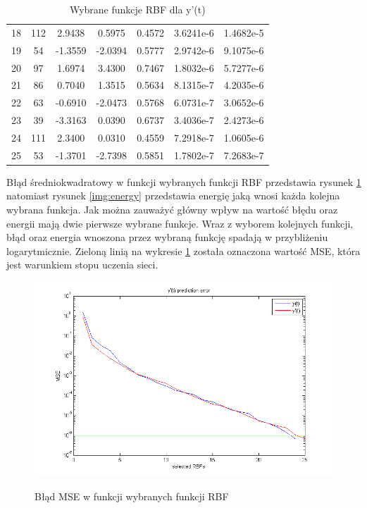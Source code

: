 \begin{table}[ht!]
\begin{tabular}{ |c| c| c| c| c| c| c| }
   18 & 112 &   2.9438 &   0.5975  &  0.4572 &   3.6241e-6 & 1.4682e-5 \\
   19 &  54 &  -1.3559 &  -2.0394  &  0.5777 &   2.9742e-6 & 9.1075e-6 \\
   20 &  97 &   1.6974 &   3.4300  &  0.7467 &   1.8032e-6 & 5.7277e-6 \\
   21 &  86 &   0.7040 &   1.3515  &  0.5634 &   8.1315e-7 & 4.2035e-6 \\
   22 &  63 &  -0.6910 &  -2.0473  &  0.5768 &   6.0731e-7 & 3.0652e-6 \\
   23 &  39 &  -3.3163 &   0.0390  &  0.6737 &   3.4036e-7 & 2.4273e-6 \\
   24 & 111 &   2.3400 &   0.0310  &  0.4559 &   7.2918e-7 & 1.0605e-6 \\
   25 &  53 &  -1.3701 &  -2.7398  &  0.5851 &   1.7802e-7 & 7.2683e-7 \\
    \hline
\end{tabular}

\caption{Wybrane funkcje RBF dla y'(t)}
\label{tab:rbf_tabela_x2}
\end{table}

\clearpage

Błąd średniokwadratowy w funkcji wybranych funkcji RBF przedstawia rysunek \ref{img:prediction_error} natomiast rysunek \ref{img:energy} przedstawia energię jaką wnosi każda kolejna wybrana funkcja. Jak można zauważyć główny wpływ na wartość błędu oraz energii mają dwie pierwsze wybrane funkcje. Wraz z wyborem kolejnych funkcji, błąd oraz energia wnoszona przez wybraną funkcję spadają w przybliżeniu logarytmicznie. Zieloną linią na wykresie \ref{img:prediction_error} została oznaczona wartość MSE, która jest warunkiem stopu uczenia sieci.

\begin{figure}[ht!]
	\centering

	{\includegraphics[width=\textwidth]
	{images/prediction_error.png}}

	\caption{Błąd MSE w funkcji wybranych funkcji RBF}
	\label{img:prediction_error}
\end{figure}


